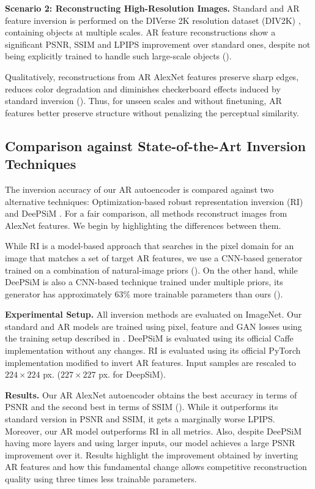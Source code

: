 \textbf{Scenario 2: Reconstructing High-Resolution Images.} Standard and AR feature inversion is performed on the DIVerse 2K resolution dataset (DIV2K) \cite{agustsson_2017_ntire}, containing objects at multiple scales. AR feature reconstructions show a significant PSNR, SSIM and LPIPS improvement over standard ones, despite not being explicitly trained to handle such large-scale objects ().

Qualitatively, reconstructions from AR AlexNet features preserve sharp edges, reduces color degradation and diminishes checkerboard effects induced by standard inversion (). Thus, for unseen scales and without finetuning, AR features better preserve structure without penalizing the perceptual similarity.

\subsection{Comparison against State-of-the-Art Inversion Techniques}
\label{sec:experimental_comparison}
The inversion accuracy of our AR autoencoder is compared against two alternative techniques: Optimization-based robust representation inversion (RI) \cite{engstrom_2019_adversarial} and DeePSiM \cite{dosovitskiy_2015_inverting}. For a fair comparison, all methods reconstruct images from AlexNet features. We begin by highlighting the differences between them.

While RI is a model-based approach that searches in the pixel domain for an image that matches a set of target AR features, we use a CNN-based generator trained on a combination of natural-image priors (). On the other hand, while DeePSiM is also a CNN-based technique trained under multiple priors, its generator has approximately $63\%$ more trainable parameters than ours ().

\textbf{Experimental Setup.} All inversion methods are evaluated on ImageNet. Our standard and AR models are trained using pixel, feature and GAN losses using the training setup described in . DeePSiM is evaluated using its official Caffe implementation without any changes. RI is evaluated using its official PyTorch implementation modified to invert  AR features. Input samples are rescaled to $224 \times 224$ px. ($227 \times 227$ px. for DeepSiM).

\textbf{Results.} Our AR AlexNet autoencoder obtains the best accuracy in terms of PSNR and the second best in terms of SSIM (). While it outperforms its standard version in PSNR and SSIM, it gets a marginally worse LPIPS. Moreover, our AR model outperforms RI in all metrics. Also, despite DeePSiM having more layers and using larger inputs, our model achieves a large PSNR improvement over it. Results highlight the improvement obtained by inverting AR features and how this fundamental change allows competitive reconstruction quality using three times less trainable parameters.


